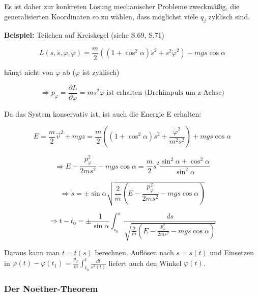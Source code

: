 \documentclass[10pt, letterpaper]{article}
\begin{document}
Es ist daher zur konkreten Lösung mechanischer Probleme zweckmäßig, die generalisierten Koordinaten so zu wählen, dass möglichst viele $q_j$ zyklisch sind.

\textbf{Beispiel:} Teilchen auf Kreiskegel (siehe S.69, S.71)

\[L(s,\dot{s},\varphi,\dot{\varphi}) = \frac{m}{2}\left((1+\cos^2\alpha)\dot{s}^2 + s^2\dot{\varphi}^2\right) - mgs\cos\alpha\]

hängt nicht von $\varphi$ ab ($\varphi$ ist zyklisch)

\[\Rightarrow p_\varphi = \frac{\partial L}{\partial \dot{\varphi}} = ms^2\dot{\varphi} \text{ ist erhalten (Drehimpuls um z-Achse)}\]

Da das System konservativ ist, ist auch die Energie E erhalten:

\[E = \frac{m}{2}\vec{v}^2 + mgz = \frac{m}{2}\left((1+\cos^2\alpha)\dot{s}^2 + \frac{\dot{\varphi}^2}{m^2s^2}\right) + mgs\cos\alpha\]

\[\Rightarrow E - \frac{p_\varphi^2}{2ms^2} - mgs\cos\alpha = \frac{m}{2}\dot{s}^2\frac{\sin^2\alpha+\cos^2\alpha}{\sin^2\alpha}\]

\[\Rightarrow \dot{s} = \pm\sin\alpha\sqrt{\frac{2}{m}\left(E - \frac{p_\varphi^2}{2ms^2} - mgs\cos\alpha\right)}\]

\[\Rightarrow t-t_0 = \pm\frac{1}{\sin\alpha}\int_{s_0}^s\frac{ds}{\sqrt{\frac{2}{m}\left(E - \frac{p_\varphi^2}{2ms^2} - mgs\cos\alpha\right)}}\]

Daraus kann man $t=t(s)$ berechnen. Auflösen nach $s=s(t)$ und Einsetzen in $\varphi(t)-\varphi(t_1)=\frac{p_\varphi}{m}\int_{t_0}^t\frac{dt}{s^2(t)}$ liefert auch den Winkel $\varphi(t)$.







\subsubsection{Der Noether-Theorem} 




\end{document}
